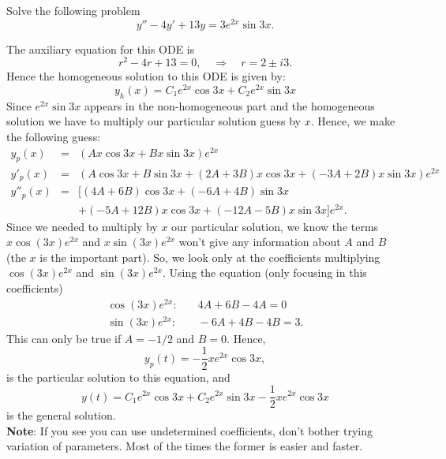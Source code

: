 \documentclass[11pt]{article}
\begin{document}
\begin{problem}
Solve the following problem
\begin{equation*}
     y''-4y'+13y=3e^{2x}\sin 3x.
\end{equation*}
\end{problem}
\begin{solution}
The auxiliary equation for this ODE is 
\begin{equation}
r^2 -4r +13 =0, \quad  \Rightarrow \quad r= 2 \pm i 3.
\end{equation}
Hence the homogeneous solution to this ODE is given by:
\begin{equation}
y_{h}(x) = C_{1} e^{2 x} \cos 3x  + C_{2} e^{2x}\sin 3x
\end{equation}
Since $e^{2x}\sin 3x$ appears in the non-homogeneous part and the homogeneous solution we have to multiply our particular solution guess by $x$. Hence, we make the following guess:
\begin{eqnarray*}
y_{p}(x) & = & (Ax\cos3x+Bx\sin3x)e^{2x} \\
y'_{p}(x) & = & (A\cos3x+B\sin3x+(2A+3B)x\cos 3x + (-3A +2B)x \sin 3x)e^{2x} \\
y''_{p}(x) & = & [(4A+6B)\cos3x+(-6A+4B)\sin 3x \\ & & + (-5A+12B)x\cos 3x + (-12A -5B)x \sin 3x]e^{2x}.
\end{eqnarray*}
Since we needed to multiply by $x$ our particular solution, we know the terms $x\cos (3x) e^{2x}$ and $x\sin (3x) e^{2x}$ won't give any information about $A$ and $B$ (the $x$ is the important part). So, we look only at the coefficients multiplying $\cos(3x)e^{2x}$ and $\sin(3x)e^{2x}$. Using the equation (only focusing in this coefficients)
\begin{equation*} \begin{split}
\cos(3x)e^{2x}:& \quad  4A +6B -4A = 0 \\
\sin(3x)e^{2x}:& \quad  -6A +4B -4B = 3.
\end{split}
\end{equation*}
This can only be true if $A = -1/2$ and $B=0$. Hence, 
$$y_{p}(t) = -\frac{1}{2}xe^{2x}\cos3x,$$ 
is the particular solution to this equation, and
\[\boxed{y(t) = C_{1} e^{2 x} \cos 3x  + C_{2} e^{2x}\sin 3x -\frac{1}{2}xe^{2x}\cos3x}\]
is the general solution. \\
\textbf{Note}: If you see you can use undetermined coefficients, don't bother trying variation of parameters. Most of the times the former is easier and faster. 
\end{solution}
\end{document}
